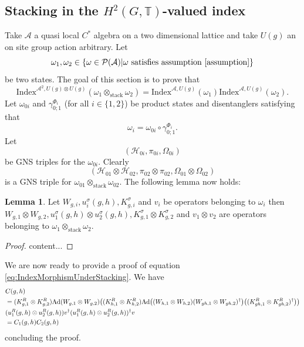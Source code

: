 \documentclass[12pt,a4paper,twoside]{article}
\let\originalleft\left
\let\originalright\right
\renewcommand{\left}{\mathopen{}\mathclose\bgroup\originalleft}
\renewcommand{\right}{\aftergroup\egroup\originalright}
\newcommand{\PP}{\mathcal P}
\newcommand{\HH}{\mathcal H}
\newcommand{\TT}{\mathbb T}
\renewcommand{\AA}{\mathcal A}
\newcommand{\Ad}[1]{\textrm{Ad}\left(#1\right)}
\theoremstyle{definition}
\newtheorem{lemma}[theorem]{Lemma}
\numberwithin{equation}{section}
\begin{document}
\subsection{Stacking in the $H^2(G,\TT)$-valued index}\label{sec:StackingOneTranslation}
Take $\AA$ a quasi local $C^*$ algebra on a two dimensional lattice and take $U(g)$ an on site group action arbitrary. Let
\begin{equation}
	\omega_1,\omega_2\in\{\omega\in\PP(\AA)|\omega\text{ satisfies assumption \ref{assumption}}\}
\end{equation}
be two states. The goal of this section is to prove that
\begin{equation}\label{eq:IndexMorphismUnderStacking}
	\textrm{Index}^{\AA^2,U(g)\otimes U(g)}(\omega_1\otimes_{\text{stack}}\omega_2)=\textrm{Index}^{\AA,U(g)}(\omega_1)\textrm{Index}^{\AA,U(g)}(\omega_2).
\end{equation}
Let $\omega_{0i}$ and $\gamma_{0;1}^{\Phi_i}$ (for all $i\in\{1,2\}$) be product states and disentanglers satisfying that
\begin{equation}
	\omega_i=\omega_{0i}\circ\gamma_{0;1}^{\Phi_i}.
\end{equation}
Let
\begin{equation}
	(\HH_{0i},\pi_{0i},\Omega_{0i})
\end{equation}
be GNS triples for the $\omega_{0i}$. Clearly
\begin{equation}
	(\HH_{01}\otimes\HH_{02},\pi_{02}\otimes\pi_{02},\Omega_{01}\otimes\Omega_{02})
\end{equation}
is a GNS triple for $\omega_{01}\otimes_{\text{stack}}\omega_{02}$. The following lemma now holds:
\begin{lemma}
	Let $W_{g,i},u^\sigma_i(g,h),K_{g,i}^\sigma$ and $v_{i}$ be operators belonging to $\omega_i$ then $W_{g,1}\otimes W_{g,2},u^\sigma_1(g,h)\otimes u^\sigma_2(g,h),K_{g,1}^\sigma\otimes K_{g,2}^\sigma$ and $v_{1}\otimes v_{2}$ are operators belonging to $\omega_1\otimes_{\text{stack}}\omega_2$.
\end{lemma}
\begin{proof}
	content...
\end{proof}
We are now ready to provide a proof of equation \ref{eq:IndexMorphismUnderStacking}. We have
\begin{align}
	&C(g,h)\\
	\nonumber
	&=(K_{g,1}^R\otimes K_{g,2}^R)\Ad{W_{g,1}\otimes W_{g,2}}\left((K_{h,1}^R\otimes K_{h,2}^R)\Ad{(W_{h,1}\otimes W_{h,2})(W_{gh,1}\otimes W_{gh,2})^\dagger}\left((K_{gh,1}^R\otimes K_{gh,2}^R)^\dagger\right)\right)\\
	&(u^R_1(g,h)\otimes u^R_2(g,h))v^\dagger (u^R_1(g,h)\otimes u^R_2(g,h))^\dagger v\\
	&=C_1(g,h)C_2(g,h)
\end{align}
concluding the proof.
\end{document}
